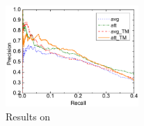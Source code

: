\begin{figure}[t!]
\setlength{\abovecaptionskip}{3pt}
\includegraphics[width=0.45\textwidth]{figures/re_att_avg_cmp_exp.pdf}
\caption{Results on \EntityRE}
\label{fig: Riedel_res}
\end{figure}




